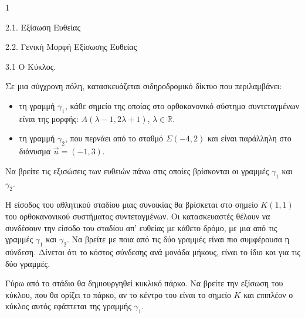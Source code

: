 \begin{ylh}{1}
    \item 2.1. Εξίσωση Ευθείας
    \item 2.2. Γενική Μορφή Εξίσωσης Ευθείας
    \item 3.1 Ο Κύκλος.
\end{ylh}
Σε μια σύγχρονη πόλη, κατασκευάζεται σιδηροδρομικό δίκτυο που περιλαμβάνει:
\begin{itemize}
    \item τη γραμμή $\gamma_1$, κάθε σημείο της οποίας στο ορθοκανονικό σύστημα συντεταγμένων είναι της μορφής: $A(\lambda-1, 2\lambda+1)$, $\lambda \in \mathbb{R}$.
    \item τη γραμμή $\gamma_2$, που περνάει από το σταθμό $Σ(-4, 2)$ και είναι παράλληλη στο διάνυσμα $\vec{u} = (-1, 3)$.
\end{itemize}
\begin{alist}
    \item Να βρείτε τις εξισώσεις των ευθειών πάνω στις οποίες βρίσκονται οι γραμμές $\gamma_1$ και $\gamma_2$. 
    \item Η είσοδος του αθλητικού σταδίου μιας συνοικίας θα βρίσκεται στο σημείο $K(1, 1)$ του ορθοκανονικού συστήματος συντεταγμένων. Οι κατασκευαστές θέλουν να συνδέσουν την είσοδο του σταδίου απ' ευθείας με κάθετο δρόμο, με μια από τις γραμμές $\gamma_1$ και $\gamma_2$. Να βρείτε με ποια από τις δύο γραμμές είναι πιο συμφέρουσα η σύνδεση. Δίνεται ότι το κόστος σύνδεσης ανά μονάδα μήκους, είναι το ίδιο και για τις δύο γραμμές. 
    \item Γύρω από το στάδιο θα δημιουργηθεί κυκλικό πάρκο. Να βρείτε την εξίσωση του κύκλου, που θα ορίζει το πάρκο, αν το κέντρο του είναι το σημείο $K$ και επιπλέον ο κύκλος αυτός εφάπτεται της γραμμής $\gamma_1$. 
\end{alist}